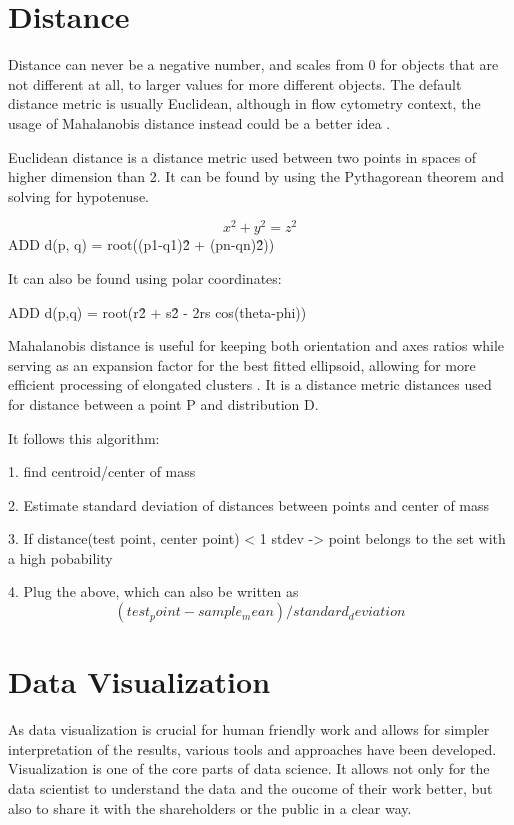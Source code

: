\section{Distance}
\label{sec:distance}
Distance can never be a negative number, and scales from 0 for objects that are not different at all, to larger values for more different objects. The default distance metric is usually Euclidean, although in flow cytometry context, the usage of Mahalanobis distance instead could be a better idea \cite{fivser2012detection}.

Euclidean distance is a distance metric used between two points in spaces of higher dimension than 2. It can be found by using the Pythagorean theorem and solving for hypotenuse. 


 \[ x^2 + y^2= z^2 \]
 ADD d(p, q) = root((p1-q1)\^2 + (pn-qn)\^2))

 It can also be found using polar coordinates:

 ADD d(p,q) = root(r\^2 + s\^2 - 2rs cos(theta-phi)) 

Mahalanobis distance is useful for keeping both orientation and axes ratios while serving as an expansion factor for the best fitted ellipsoid, allowing for more efficient processing of elongated clusters \cite{zamir2005resolving}. It is a distance metric distances used for distance between a point P and distribution D. 

It follows this algorithm:

1. find centroid/center of mass

2. Estimate standard deviation of distances between points and center of mass

3. If distance(test point, center point) < 1 stdev -> point belongs to the set with a high pobability

4. Plug the above, which can also be written as 
\[(test_point - sample_mean)/standard_deviation\]


\section{Data Visualization}
\label{sec:dataviz}
As data visualization is crucial for human friendly work and allows for simpler interpretation of the results, various tools and approaches have been developed. Visualization is one of the core parts of data science. It allows not only for the data scientist to understand the data and the oucome of their work better, but also to share it with the shareholders or the public in a clear way.

